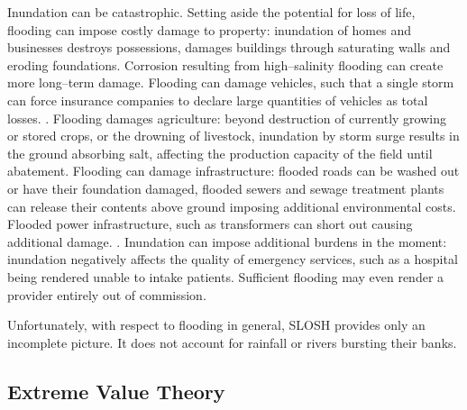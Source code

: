 Inundation can be catastrophic.  Setting aside the potential for loss of life, 
    flooding can impose costly damage to property: inundation of homes and 
    businesses destroys possessions, damages buildings through saturating 
    walls and eroding foundations.  Corrosion resulting from high--salinity
    flooding can create more long--term damage.\needcite  
    Flooding can damage vehicles, such that a single storm can force insurance 
    companies to declare large quantities of vehicles as total losses. 
    \needcite.  Flooding damages agriculture: beyond 
    destruction of currently growing or stored crops, or the drowning of 
    livestock, inundation by storm surge results in the ground absorbing salt, 
    affecting the production capacity of the field until abatement. Flooding can
    damage infrastructure: flooded roads can be washed out or have their 
    foundation damaged, flooded sewers and sewage treatment plants can release 
    their contents above ground imposing additional environmental costs.  
    Flooded power infrastructure, such as transformers can short out causing 
    additional damage. \citep{hutchings2021}.  Inundation can impose additional 
    burdens in the moment:  inundation negatively affects the quality of 
    emergency services, such as a hospital being rendered unable to intake 
    patients.  Sufficient flooding may even render a provider entirely out of 
    commission.

Unfortunately, with respect to flooding in general, SLOSH provides only an 
    incomplete picture.  It does not account for rainfall or rivers bursting
    their banks.


\subsection{Extreme Value Theory}



